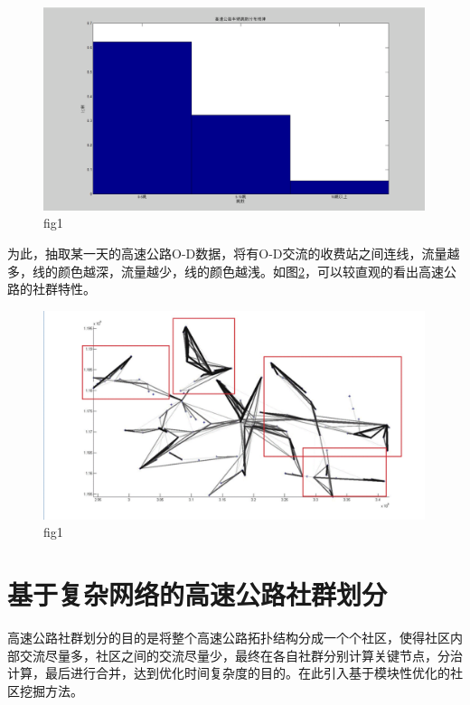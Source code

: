 		\begin{figure}[h]
		\centering
				\begin{minipage}{0.8\linewidth}
					\centering
					\includegraphics[width=4.4in]{picture/tiaoshu}
					\caption{fig1}
					\label{fig4}
				\end{minipage}%
		\end{figure}

		为此，抽取某一天的高速公路O-D数据，将有O-D交流的收费站之间连线，流量越多，线的颜色越深，流量越少，线的颜色越浅。如图\ref{fig5}，可以较直观的看出高速公路的社群特性。

		\begin{figure}[h]
		\centering
				\begin{minipage}{0.8\linewidth}
					\centering
					\includegraphics[width=4.4in]{picture/shequntexing}
					\caption{fig1}
					\label{fig5}
				\end{minipage}%
		\end{figure}
	\section{基于复杂网络的高速公路社群划分}
		高速公路社群划分的目的是将整个高速公路拓扑结构分成一个个社区，使得社区内部交流尽量多，社区之间的交流尽量少，最终在各自社群分别计算关键节点，分治计算，最后进行合并，达到优化时间复杂度的目的。在此引入基于模块性优化的社区挖掘方法。

